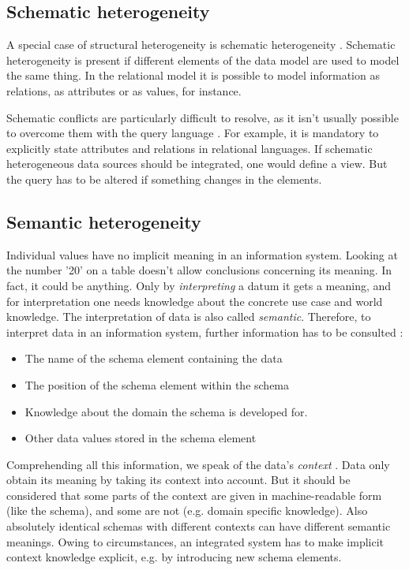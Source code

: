 \subsection{Schematic  heterogeneity}
A special case of structural heterogeneity is schematic heterogeneity \cite[p. 67]{DBLP:books/dp/LeserN2006}. Schematic heterogeneity is present if different elements of the data model are used to model the same thing. In the relational model it is possible to model information as relations, as attributes or as values, for instance. 

Schematic conflicts are particularly difficult to resolve, as it isn't usually possible to overcome them with the query language \cite[p. 68]{DBLP:books/dp/LeserN2006}. For example, it is mandatory to explicitly state attributes and relations in relational languages. If schematic heterogeneous data sources should be integrated, one would define a view. But the query has to be altered if something changes in the elements.

\subsection{Semantic  heterogeneity}
Individual values have no implicit meaning in an information system. Looking at the number '20' on a table doesn't allow conclusions concerning its meaning. In fact, it could be anything. Only by \textit{interpreting} a datum it gets a meaning, and for interpretation one needs knowledge about the concrete use case and world knowledge. The interpretation of data is also called \textit{semantic}. Therefore, to interpret data in an information system, further information has to be consulted \cite[p. 73]{DBLP:books/dp/LeserN2006}:
\begin{itemize}
\item The name of the schema element containing the data
\item The position of the schema element within the schema
\item Knowledge about the domain the schema is developed for.
\item Other data values stored in the schema element
\end{itemize}

Comprehending all this information, we speak of the data's \textit{context} \cite[p. 74]{DBLP:books/dp/LeserN2006}. 
Data only obtain its meaning by taking its context into account. But it should be considered that some parts of the context are given in machine-readable form (like the schema), and some are not (e.g. domain specific knowledge). 
Also absolutely identical schemas with different contexts can have different semantic meanings. Owing to circumstances, an integrated system has to make implicit context knowledge explicit, e.g. by introducing new schema elements.

